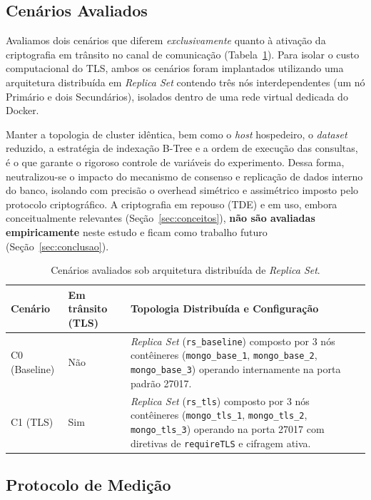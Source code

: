 \documentclass[12pt]{article}
\begin{document}
\subsection{Cenários Avaliados}
\label{sec:met-cenarios}

Avaliamos dois cenários que diferem \emph{exclusivamente} quanto à ativação da criptografia em trânsito no canal de comunicação (Tabela~\ref{tab:cenarios}). Para isolar o custo computacional do TLS, ambos os cenários foram implantados utilizando uma arquitetura distribuída em \emph{Replica Set} contendo três nós interdependentes (um nó Primário e dois Secundários), isolados dentro de uma rede virtual dedicada do Docker. 

Manter a topologia de cluster idêntica, bem como o \emph{host} hospedeiro, o \emph{dataset} reduzido, a estratégia de indexação B-Tree e a ordem de execução das consultas, é o que garante o rigoroso controle de variáveis do experimento. Dessa forma, neutralizou-se o impacto do mecanismo de consenso e replicação de dados interno do banco, isolando com precisão o overhead simétrico e assimétrico imposto pelo protocolo criptográfico. A criptografia em repouso (TDE) e em uso, embora conceitualmente relevantes (Seção~\ref{sec:conceitos}), \textbf{não são avaliadas empiricamente} neste estudo e ficam como trabalho futuro (Seção~\ref{sec:conclusao}).

\begin{table}[ht]
\centering
\caption{Cenários avaliados sob arquitetura distribuída de \emph{Replica Set}.}
\label{tab:cenarios}
\begin{tabular}{@{}llp{7.5cm}@{}}
\toprule
\textbf{Cenário} & \textbf{Em trânsito (TLS)}& \textbf{Topologia Distribuída e Configuração} \\
\midrule
C0 (Baseline) & Não & \emph{Replica Set} (\texttt{rs\_baseline}) composto por 3 nós contêineres (\texttt{mongo\_base\_1}, \texttt{mongo\_base\_2}, \texttt{mongo\_base\_3}) operando internamente na porta padrão 27017. \\
\midrule
C1 (TLS)      & Sim & \emph{Replica Set} (\texttt{rs\_tls}) composto por 3 nós contêineres (\texttt{mongo\_tls\_1}, \texttt{mongo\_tls\_2}, \texttt{mongo\_tls\_3}) operando na porta 27017 com diretivas de \texttt{requireTLS} e cifragem ativa. \\
\bottomrule
\end{tabular}
\end{table}

\subsection{Protocolo de Medição}
\label{sec:met-protocolo}
\end{document}
